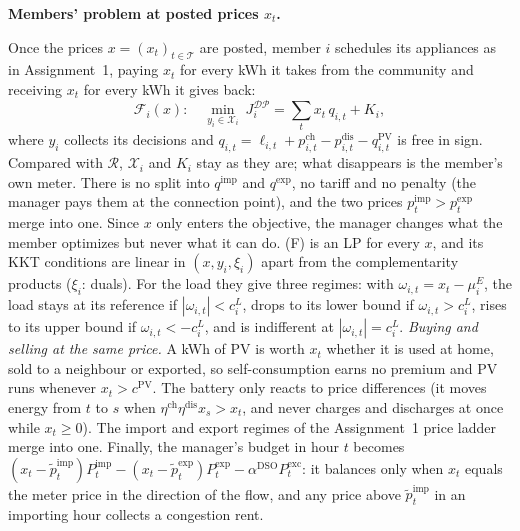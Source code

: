 \documentclass[10pt,a4paper]{article}
\newcommand{\cR}{\mathcal{R}}
\newcommand{\cDP}{\mathcal{DP}}
\newcommand{\cT}{\mathcal{T}}
\newcommand{\pti}{\tilde p^{\mathrm{imp}}_t}
\newcommand{\pte}{\tilde p^{\mathrm{exp}}_t}
\newcommand{\Pimp}{P^{\mathrm{imp}}_t}
\newcommand{\Pexp}{P^{\mathrm{exp}}_t}
\newcommand{\Pexc}{P^{\mathrm{exc}}_t}
\newcommand{\aD}{\alpha^{\mathrm{DSO}}}
\newcommand{\qitem}[2]{\par\smallskip\noindent{\color{dtured}\textbf{#1}}\enspace\textbf{#2}\par\nopagebreak}
\begin{document}
\qitem{C1}{Members' problem at posted prices $x_t$.}
\begin{answer}
Once the prices $x=(x_t)_{t\in\cT}$ are posted, member $i$ schedules its appliances as in Assignment~1, paying $x_t$ for every kWh it takes from the community and receiving $x_t$ for every kWh it gives back:
\begin{equation}
\mathcal F_i(x):\quad \min_{y_i\in\mathcal X_i}\ J^{\cDP}_i=\textstyle\sum_t x_t\,q_{i,t}+K_i,\tag{F}
\end{equation}
where $y_i$ collects its decisions and $q_{i,t}=\ell_{i,t}+p^{\mathrm{ch}}_{i,t}-p^{\mathrm{dis}}_{i,t}-q^{\mathrm{PV}}_{i,t}$ is free in sign. Compared with $\cR$, $\mathcal X_i$ and $K_i$ stay as they are; what disappears is the member's own meter. There is no split into $q^{\mathrm{imp}}$ and $q^{\mathrm{exp}}$, no tariff and no penalty (the manager pays them at the connection point), and the two prices $p^{\mathrm{imp}}_t>p^{\mathrm{exp}}_t$ merge into one. Since $x$ only enters the objective, the manager changes what the member optimizes but never what it can do. (F) is an LP for every $x$, and its KKT conditions are linear in $(x,y_i,\xi_i)$ apart from the complementarity products ($\xi_i$: duals). For the load they give three regimes: with $\omega_{i,t}=x_t-\mu^E_i$, the load stays at its reference if $|\omega_{i,t}|<c^L_i$, drops to its lower bound if $\omega_{i,t}>c^L_i$, rises to its upper bound if $\omega_{i,t}<-c^L_i$, and is indifferent at $|\omega_{i,t}|=c^L_i$.
\emph{Buying and selling at the same price.} A kWh of PV is worth $x_t$ whether it is used at home, sold to a neighbour or exported, so self-consumption earns no premium and PV runs whenever $x_t>c^{\mathrm{PV}}$. The battery only reacts to price differences (it moves energy from $t$ to $s$ when $\eta^{\mathrm{ch}}\eta^{\mathrm{dis}}x_s>x_t$, and never charges and discharges at once while $x_t\ge0$). The import and export regimes of the Assignment~1 price ladder merge into one. Finally, the manager's budget in hour $t$ becomes $(x_t-\pti)\Pimp-(x_t-\pte)\Pexp-\aD\Pexc$: it balances only when $x_t$ equals the meter price in the direction of the flow, and any price above $\pti$ in an importing hour collects a congestion rent.
\end{answer}
\end{document}
